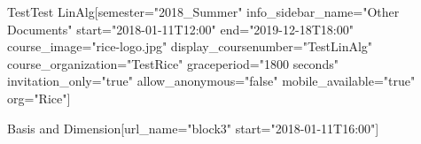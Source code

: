 \documentclass[12pt]{article}
\begin{document}


\def\defaultproblemattributes{attempts="1" showanswer="attempted" rerandomize="per_student"}

\begin{edXcourse}{Test}{Test LinAlg}[semester="2018_Summer" info_sidebar_name="Other Documents" start="2018-01-11T12:00" end="2019-12-18T18:00" course_image="rice-logo.jpg" display_coursenumber="TestLinAlg" course_organization="TestRice" graceperiod="1800 seconds" invitation_only="true" allow_anonymous="false" mobile_available="true"  org="Rice"]
 
%  


% 
 

 






\begin{edXchapter}{Basis and Dimension}[url_name="block3" start="2018-01-11T16:00"]






\def\edxbaseoutputname{hw1}







% 




\endedxsequential


\def\edxbaseoutputname{hw4}







% 




\endedxsequential



\end{edXchapter}

\end{edXcourse}
\end{document}
